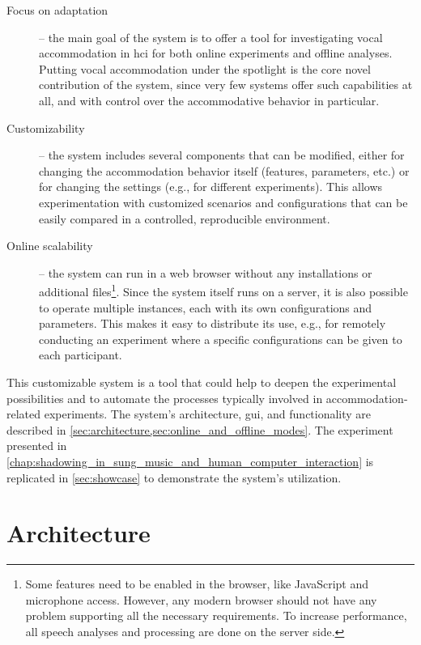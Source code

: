 \begin{description}
	\item[Focus on adaptation] --
	the main goal of the system is to offer a tool for investigating vocal accommodation in \ac{hci} for both online experiments and offline analyses.
	Putting vocal accommodation under the spotlight is the core novel contribution of the system, since very few systems offer such capabilities at all, and with control over the accommodative behavior in particular.
	
	\item[Customizability] --
	the system includes several components that can be modified, either for changing the accommodation behavior itself (features, parameters, etc.) or for changing the settings (e.g., for different experiments).
	This allows experimentation with customized scenarios and configurations that can be easily compared in a controlled, reproducible environment.
	
	\item[Online scalability] --
	the system can run in a web browser without any installations or additional files\footnote{Some features need to be enabled in the browser, like JavaScript and microphone access.
	However, any modern browser should not have any problem supporting all the necessary requirements.
	To increase performance, all speech analyses and processing are done on the server side.}.
	Since the system itself runs on a server, it is also possible to operate multiple instances, each with its own configurations and parameters.
	This makes it easy to distribute its use, e.g., for remotely conducting an experiment where a specific configurations can be given to each participant.
\end{description}
%
This customizable system is a tool that could help to deepen the experimental possibilities and to automate the processes typically involved in accommodation-related experiments.
The system's architecture, \ac{gui}, and functionality are described in \cref{sec:architecture,sec:online_and_offline_modes}.
The experiment presented in \cref{chap:shadowing_in_sung_music_and_human_computer_interaction} is replicated in \cref{sec:showcase} to demonstrate the system's utilization.

\section{Architecture}
\label{sec:architecture}

